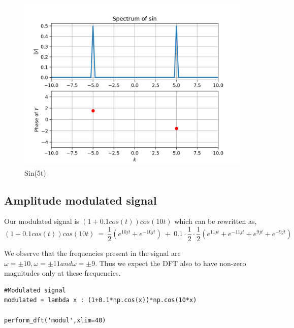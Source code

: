 \documentclass[11pt, a4paper]{article}
\begin{document}
\begin{figure}[!tbh]
   	\centering
   	\includegraphics[scale=0.7]{sin.png}   
   	\caption{Sin(5t)}
   	\label{fig:Figure_1}
\end{figure}
\subsection{Amplitude modulated signal}
Our modulated signal is $(1 + 0.1cos(t))cos(10t)$ which can be rewritten as,
$$
(1 + 0.1cos(t))cos(10t)\ =\ \frac{1}{2}(e^{10jt} + e^{-10jt})\ +\ 0.1 \cdot \frac{1}{2} \cdot \frac{1}{2}(e^{11jt} + e^{-11jt} + e^{9jt} + e^{-9jt})
$$

We observe that the frequencies present in the signal are $\omega = \pm 10 , \omega = \pm 11 and \omega = \pm 9.$ Thus we expect the DFT also to have non-zero magnitudes only at these frequencies.
\begin{lstlisting}
#Modulated signal
modulated = lambda x : (1+0.1*np.cos(x))*np.cos(10*x)

perform_dft('modul',xlim=40)
\end{lstlisting}
\end{document}
